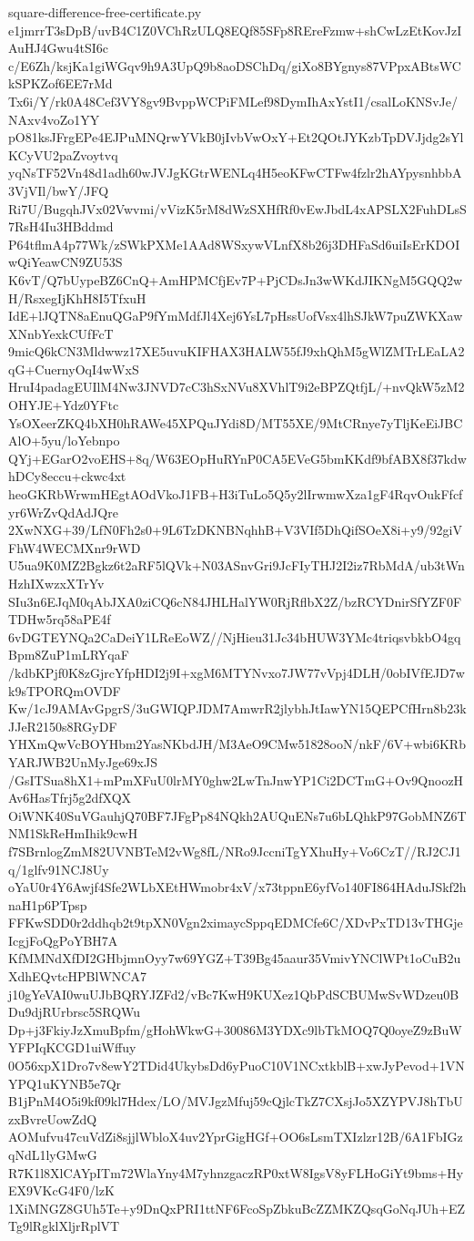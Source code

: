 \documentclass[11pt]{article}
\theoremstyle{definition}
\theoremstyle{remark}
\begin{document}
\begin{filecontents*}[overwrite]{square-difference-free-certificate.py}
e1jmrrT3sDpB/uvB4C1Z0VChRzULQ8EQf85SFp8REreFzmw+shCwLzEtKovJzIAuHJ4Gwu4tSI6c
c/E6Zh/ksjKa1giWGqv9h9A3UpQ9b8aoDSChDq/giXo8BYgnys87VPpxABtsWCkSPKZof6EE7rMd
Tx6i/Y/rk0A48Cef3VY8gv9BvppWCPiFMLef98DymIhAxYstI1/csalLoKNSvJe/NAxv4voZo1YY
pO81ksJFrgEPe4EJPuMNQrwYVkB0jIvbVwOxY+Et2QOtJYKzbTpDVJjdg2sYlKCyVU2paZvoytvq
yqNsTF52Vn48d1adh60wJVJgKGtrWENLq4H5eoKFwCTFw4fzlr2hAYpysnhbbA3VjVIl/bwY/JFQ
Ri7U/BugqhJVx02Vwvmi/vVizK5rM8dWzSXHfRf0vEwJbdL4xAPSLX2FuhDLsS7RsH4Iu3HBddmd
P64tflmA4p77Wk/zSWkPXMe1AAd8WSxywVLnfX8b26j3DHFaSd6uiIsErKDOIwQiYeawCN9ZU53S
K6vT/Q7bUypeBZ6CnQ+AmHPMCfjEv7P+PjCDsJn3wWKdJIKNgM5GQQ2wH/RsxegIjKhH8I5TfxuH
IdE+lJQTN8aEnuQGaP9fYmMdfJl4Xej6YsL7pHssUofVsx4lhSJkW7puZWKXawXNnbYexkCUfFcT
9micQ6kCN3Mldwwz17XE5uvuKIFHAX3HALW55fJ9xhQhM5gWlZMTrLEaLA2qG+CuernyOqI4wWxS
HruI4padagEUIlM4Nw3JNVD7cC3hSxNVu8XVhlT9i2eBPZQtfjL/+nvQkW5zM2OHYJE+Ydz0YFtc
YsOXeerZKQ4bXH0hRAWe45XPQuJYdi8D/MT55XE/9MtCRnye7yTljKeEiJBCAlO+5yu/loYebnpo
QYj+EGarO2voEHS+8q/W63EOpHuRYnP0CA5EVeG5bmKKdf9bfABX8f37kdwhDCy8eccu+ckwc4xt
heoGKRbWrwmHEgtAOdVkoJ1FB+H3iTuLo5Q5y2lIrwmwXza1gF4RqvOukFfcfyr6WrZvQdAdJQre
2XwNXG+39/LfN0Fh2s0+9L6TzDKNBNqhhB+V3VIf5DhQifSOeX8i+y9/92giVFhW4WECMXnr9rWD
U5ua9K0MZ2Bgkz6t2aRF5lQVk+N03ASnvGri9JcFIyTHJ2I2iz7RbMdA/ub3tWnHzhIXwzxXTrYv
SIu3n6EJqM0qAbJXA0ziCQ6cN84JHLHalYW0RjRflbX2Z/bzRCYDnirSfYZF0FTDHw5rq58aPE4f
6vDGTEYNQa2CaDeiY1LReEoWZ//NjHieu31Jc34bHUW3YMc4triqsvbkbO4gqBpm8ZuP1mLRYqaF
/kdbKPjf0K8zGjrcYfpHDI2j9I+xgM6MTYNvxo7JW77vVpj4DLH/0obIVfEJD7wk9sTPORQmOVDF
Kw/1cJ9AMAvGpgrS/3uGWIQPJDM7AmwrR2jlybhJtIawYN15QEPCfHrn8b23kJJeR2150s8RGyDF
YHXmQwVcBOYHbm2YasNKbdJH/M3AeO9CMw51828ooN/nkF/6V+wbi6KRbYARJWB2UnMyJge69xJS
/GsITSua8hX1+mPmXFuU0lrMY0ghw2LwTnJnwYP1Ci2DCTmG+Ov9QnoozHAv6HasTfrj5g2dfXQX
OiWNK40SuVGauhjQ70BF7JFgPp84NQkh2AUQuENs7u6bLQhkP97GobMNZ6TNM1SkReHmIhik9cwH
f7SBrnlogZmM82UVNBTeM2vWg8fL/NRo9JccniTgYXhuHy+Vo6CzT//RJ2CJ1q/1glfv91NCJ8Uy
oYaU0r4Y6Awjf4Sfe2WLbXEtHWmobr4xV/x73tppnE6yfVo140FI864HAduJSkf2hnaH1p6PTpsp
FFKwSDD0r2ddhqb2t9tpXN0Vgn2ximaycSppqEDMCfe6C/XDvPxTD13vTHGjeIcgjFoQgPoYBH7A
KfMMNdXfDI2GHbjmnOyy7w69YGZ+T39Bg45aaur35VmivYNClWPt1oCuB2uXdhEQvtcHPBlWNCA7
j10gYeVAI0wuUJbBQRYJZFd2/vBc7KwH9KUXez1QbPdSCBUMwSvWDzeu0BDu9djRUrbrsc5SRQWu
Dp+j3FkiyJzXmuBpfm/gHohWkwG+30086M3YDXc9lbTkMOQ7Q0oyeZ9zBuWYFPIqKCGD1uiWffuy
0O56xpX1Dro7v8ewY2TDid4UkybsDd6yPuoC10V1NCxtkblB+xwJyPevod+1VNYPQ1uKYNB5e7Qr
B1jPnM4O5i9kf09kl7Hdex/LO/MVJgzMfuj59cQjlcTkZ7CXsjJo5XZYPVJ8hTbUzxBvreUowZdQ
AOMufvu47cuVdZi8sjjlWbloX4uv2YprGigHGf+OO6sLsmTXIzlzr12B/6A1FbIGzqNdL1lyGMwG
R7K1l8XlCAYpITm72WlaYny4M7yhnzgaczRP0xtW8IgsV8yFLHoGiYt9bms+HyEX9VKcG4F0/lzK
1XiMNGZ8GUh5Te+y9DnQxPRI1ttNF6FcoSpZbkuBcZZMKZQsqGoNqJUh+EZTg9lRgklXljrRplVT

\end{filecontents*}
\end{document}
